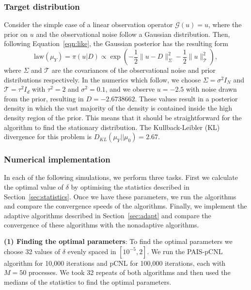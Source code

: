 \documentclass[final]{siamltex}
\newcommand{\G}{\mathcal{G}}
\begin{document}
\subsubsection{Target distribution}

Consider the simple case of a linear observation operator $\G(u) = u$, where the prior on $u$ and the observational noise follow a Gaussian distribution. Then, following Equation~\ref{eqn:like}, the Gaussian posterior has the resulting form
\begin{equation}\label{eqn:Gaussian posterior}
	\text{law}(\mu_Y) = \pi(u|D) \propto \exp\left(-\frac{1}{2}\big\|u - D\big\|^2_\Sigma - \frac{1}{2}\big\|u\big\|^2_{\mathcal{T}}\right),
\end{equation}
where $\Sigma$ and $\mathcal{T}$ are the covariances of the observational noise and prior distributions respectively. In the numerics which follow, we choose $\Sigma = \sigma^2I_N$ and $\mathcal{T} = \tau^2I_d$ with $\tau^2 =2$ and $\sigma^2 = 0.1$, and we observe $u=-2.5$ with noise drawn from the prior, resulting in $D = -2.6738662$. These values result in a posterior density in which the vast majority of the density is contained inside the high density region of the prior. This means that it should be straightforward for the algorithm to find the stationary distribution. The Kullback-Leibler (KL) divergence for this problem is $D_{KL}(\mu_Y || \mu_0) = 2.67$.

\subsubsection{Numerical implementation}\label{sec:Implementation P1}

In each of the following simulations, we perform three tasks. First we calculate the optimal value of $\delta$ by optimising the statistics described in Section~\ref{sec:statistics}. Once we have these parameters, we run the algorithms and compare the convergence speeds of the algorithms. Finally, we implement the adaptive algorithms described in Section~\ref{sec:adapt} and compare the convergence of these algorithms with the nonadaptive algorithms.

{\bf (1) Finding the optimal parameters}: To find the optimal parameters we choose 32 values of $\delta$ evenly spaced in $[10^{-5}, 2]$. We run the PAIS-pCNL algorithm for 10,000 iterations and pCNL for 100,000 iterations, each with $M=50$ processes. We took 32 repeats of both algorithms and then used the medians of the statistics to find the optimal parameters.
\end{document}
